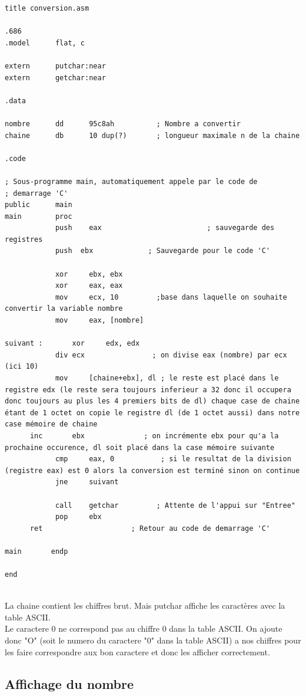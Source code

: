 \documentclass[11pt]{report}
\begin{document}
\begin{lstlisting}
title conversion.asm

.686
.model 		flat, c

extern      putchar:near
extern      getchar:near

.data

nombre      dd      95c8ah          ; Nombre a convertir
chaine      db      10 dup(?)       ; longueur maximale n de la chaine

.code

; Sous-programme main, automatiquement appele par le code de
; demarrage 'C'
public      main
main        proc
			push 	eax							; sauvegarde des registres
			push  ebx             ; Sauvegarde pour le code 'C'

			xor		ebx, ebx
			xor		eax, eax
			mov		ecx, 10         ;base dans laquelle on souhaite convertir la variable nombre
			mov		eax, [nombre]

suivant :		xor 	edx, edx
			div	ecx                ; on divise eax (nombre) par ecx (ici 10)
			mov		[chaine+ebx], dl ; le reste est placé dans le registre edx (le reste sera toujours inferieur a 32 donc il occupera donc toujours au plus les 4 premiers bits de dl) chaque case de chaine étant de 1 octet on copie le registre dl (de 1 octet aussi) dans notre case mémoire de chaine
      inc		ebx              ; on incrémente ebx pour qu'a la prochaine occurence, dl soit placé dans la case mémoire suivante
			cmp		eax, 0           ; si le resultat de la division (registre eax) est 0 alors la conversion est terminé sinon on continue
			jne		suivant

			call    getchar         ; Attente de l'appui sur "Entree"
			pop     ebx
      ret                     ; Retour au code de demarrage 'C'

main       endp

end


\end{lstlisting}

La chaine contient les chiffres brut. Mais putchar affiche les caractères avec la table ASCII.
\\Le caractere 0 ne correspond pas au chiffre 0 dans la table ASCII. On ajoute donc "O" (soit le numero du caractere "0" dans la table ASCII) a nos chiffres pour les faire correspondre aux bon caractere et donc les afficher correctement.

\subsection{Affichage du nombre}
\end{document}
